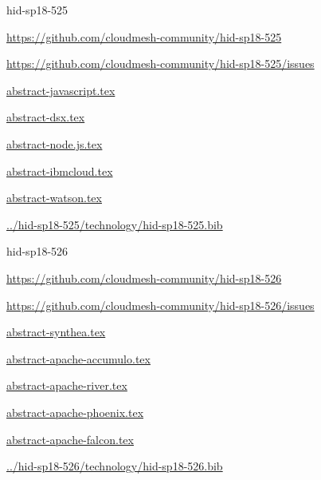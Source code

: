 \begin{IU}

hid-sp18-525

\url{https://github.com/cloudmesh-community/hid-sp18-525}

\url{https://github.com/cloudmesh-community/hid-sp18-525/issues}

\href{https://github.com/cloudmesh-community/hid-sp18-525/blob/master//technology/abstract-javascript.tex}{abstract-javascript.tex}

\href{https://github.com/cloudmesh-community/hid-sp18-525/blob/master//technology/abstract-dsx.tex}{abstract-dsx.tex}

\href{https://github.com/cloudmesh-community/hid-sp18-525/blob/master//technology/abstract-node.js.tex}{abstract-node.js.tex}

\href{https://github.com/cloudmesh-community/hid-sp18-525/blob/master//technology/abstract-ibmcloud.tex}{abstract-ibmcloud.tex}

\href{https://github.com/cloudmesh-community/hid-sp18-525/blob/master//technology/abstract-watson.tex}{abstract-watson.tex}

\href{https://github.com/cloudmesh-community/hid-sp18-525/blob/master//technology/hid-sp18-525.bib}{../hid-sp18-525/technology/hid-sp18-525.bib}

\end{IU}


\begin{IU}

hid-sp18-526

\url{https://github.com/cloudmesh-community/hid-sp18-526}

\url{https://github.com/cloudmesh-community/hid-sp18-526/issues}

\href{https://github.com/cloudmesh-community/hid-sp18-526/blob/master//technology/abstract-synthea.tex}{abstract-synthea.tex}

\href{https://github.com/cloudmesh-community/hid-sp18-526/blob/master//technology/abstract-apache-accumulo.tex}{abstract-apache-accumulo.tex}

\href{https://github.com/cloudmesh-community/hid-sp18-526/blob/master//technology/abstract-apache-river.tex}{abstract-apache-river.tex}

\href{https://github.com/cloudmesh-community/hid-sp18-526/blob/master//technology/abstract-apache-phoenix.tex}{abstract-apache-phoenix.tex}

\href{https://github.com/cloudmesh-community/hid-sp18-526/blob/master//technology/abstract-apache-falcon.tex}{abstract-apache-falcon.tex}

\href{https://github.com/cloudmesh-community/hid-sp18-526/blob/master//technology/hid-sp18-526.bib}{../hid-sp18-526/technology/hid-sp18-526.bib}

\end{IU}


